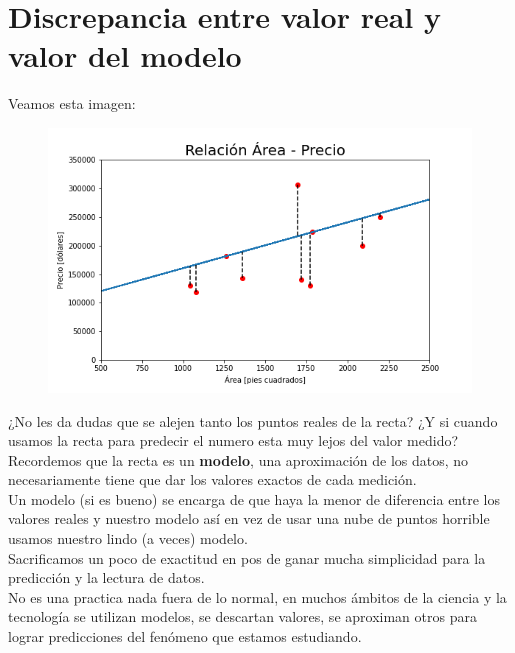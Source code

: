 \documentclass{article}
\begin{document}
\section{Discrepancia entre valor real y valor del modelo}
Veamos esta imagen:
\begin{figure}[h!]
\includegraphics[scale=0.5]{Imagenes/error.png}
\centering
\end{figure}
\newpage
¿No les da dudas que se alejen tanto los puntos reales de la recta? ¿Y si cuando usamos la recta para predecir el numero esta muy lejos del valor medido?\\
Recordemos que la recta es un \textbf{modelo}, una aproximación de los datos, no necesariamente tiene que dar los valores exactos de cada medición.\\
Un modelo (si es bueno) se encarga de que haya la menor de diferencia entre los valores reales y nuestro modelo así en vez de usar una nube de puntos horrible usamos nuestro lindo (a veces) modelo.\\
Sacrificamos un poco de exactitud en pos de ganar mucha simplicidad para la predicción y la lectura de datos.\\
No es una practica nada fuera de lo normal, en muchos ámbitos de la ciencia y la tecnología se utilizan modelos, se descartan valores, se aproximan otros para lograr predicciones del fenómeno que estamos estudiando.
\end{document}
